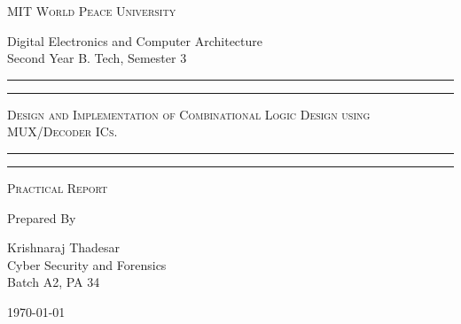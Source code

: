 \documentclass[11pt]{article}
\begin{document}
\begin{titlepage}
	\centering


	\huge\textsc{
		MIT World Peace University
	}\\

	\vspace{0.75\baselineskip} %

	\LARGE{
		Digital Electronics and Computer Architecture\\
		Second Year B. Tech, Semester 3
	}

	\vfill %


	\rule{\textwidth}{1.6pt}\vspace*{-\baselineskip}\vspace*{2pt}
	\rule{\textwidth}{0.6pt}
	\vspace{0.75\baselineskip} %



	\huge{\textsc{
			Design and Implementation of Combinational Logic Design using MUX/Decoder ICs.
		}} \\



	\vspace{0.5\baselineskip} %
	\rule{\textwidth}{0.6pt}\vspace*{-\baselineskip}\vspace*{2.8pt}
	\rule{\textwidth}{1.6pt}

	\vspace{1\baselineskip} %


	\LARGE\textsc{
		Practical Report
	} %
	\vfill


	Prepared By
	\vspace{0.5\baselineskip} %

	\Large{
		Krishnaraj Thadesar \\
		Cyber Security and Forensics\\
		Batch A2, PA 34
	}


	\vspace{0.5\baselineskip} %
	\today

\end{titlepage}
\end{document}
